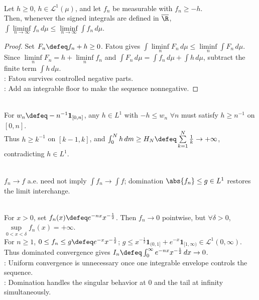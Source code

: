 \begin{theorem} \label{thm:fatou-with-integrable-lower-bound} \\
Let $h\geq0$, $h\in\mathscr{L}^1(\mu)$, and let $f_n$ be measurable with $f_n\geq-h$.\\
Then, whenever the signed integrals are defined in $\overline{\R}$, $\int \liminf\limits_{n\to\infty} f_n\,d\mu\leq\liminf\limits_{n\to\infty}\int f_n\,d\mu$.
\begin{proof}
Set $F_n\defeq f_n+h\geq0$. Fatou gives $\int \liminf\limits_nF_n\,d\mu\leq\liminf\limits_n\int F_n\,d\mu$.\\
Since $\liminf\limits_nF_n=h+\liminf\limits_nf_n$ and $\int F_n\,d\mu=\int f_n\,d\mu+\int h\,d\mu$, subtract the finite term $\int h\,d\mu$.\\
: Fatou survives controlled negative parts.\\
: Add an integrable floor to make the sequence nonnegative.
\end{proof}
\end{theorem}

\begin{remark} \label{rem:negative-fatou-example-no-integrable-floor} \\
For $w_n\defeq-n^{-1}\mathbf{1}_{[0,n]}$, any $h\in L^1$ with $-h\leq w_n$ $\forall n$ must satisfy $h\geq n^{-1}$ on $[0,n]$.\\
Thus $h\geq k^{-1}$ on $[k-1,k]$, and $\int_0^N h\,dm\geq H_N\defeq\sum\limits_{k=1}^{N}\frac{1}{k}\to+\infty$, contradicting $h\in L^1$.
\end{remark}

\begin{perspective} \label{per:domination-as-limit-integral-safeguard} \\
$f_n\to f$ a.e. need not imply $\int f_n\to\int f$; domination $\abs{f_n}\leq g\in L^1$ restores the limit interchange.
\end{perspective}

\begin{example} \label{ex:dominated-convergence-improper-integral} \\
For $x>0$, set $f_n(x)\defeq e^{-nx}x^{-\frac{1}{2}}$. Then $f_n\to0$ pointwise, but $\forall\delta>0$, $\sup\limits_{0<x<\delta}f_n(x)=+\infty$.\\
For $n\geq1$, $0\leq f_n\leq g\defeq e^{-x}x^{-\frac{1}{2}}$; $g\leq x^{-\frac{1}{2}}\mathbf{1}_{(0,1]}+e^{-x}\mathbf{1}_{[1,\infty)}\in\mathscr{L}^1(0,\infty)$.\\
Thus dominated convergence gives $I_n\defeq\int_0^\infty e^{-nx}x^{-\frac{1}{2}}\,dx\to0$.\\
: Uniform convergence is unnecessary once one integrable envelope controls the sequence.\\
: Domination handles the singular behavior at $0$ and the tail at infinity simultaneously.
\end{example}

